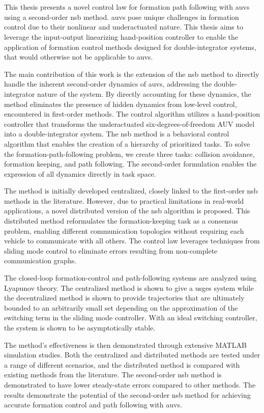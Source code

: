 \chapter*{\englishabstractname}
%
This thesis presents a novel control law for formation path following with \glspl{auv} using a second-order \gls{nsb} method. \glspl{auv} pose unique challenges in formation control due to their nonlinear and underactuated nature. This thesis aims to leverage the input-output linearizing hand-position controller to enable the application of formation control methods designed for double-integrator systems, that would otherwise not be applicable to \glspl{auv}.

The main contribution of this work is the extension of the \gls{nsb} method to directly handle the inherent second-order dynamics of \glspl{auv}, addressing the double-integrator nature of the system. By directly accounting for these dynamics, the method eliminates the presence of hidden dynamics from low-level control, encountered in first-order methods. The control algorithm utilizes a hand-position controller that transforms the underactuated six-degrees-of-freedom AUV model into a double-integrator system. The \gls{nsb} method is a behavioral control algorithm that enables the creation of a hierarchy of prioritized tasks. To solve the formation-path-following problem, we create three tasks: collision avoidance, formation keeping, and path following. The second-order formulation enables the expression of all dynamics directly in task space.

The method is initially developed centralized, closely linked to the first-order \gls{nsb} methods in the literature.  However, due to practical limitations in real-world applications, a novel distributed version of the \gls{nsb} algorithm is proposed. This distributed method reformulates the formation-keeping task as a consensus problem, enabling different communication topologies without requiring each vehicle to communicate with all others. The control law leverages techniques from sliding mode control to eliminate errors resulting from non-complete communication graphs.

The closed-loop formation-control and path-following systems are analyzed using Lyapunov theory. The centralized method is shown to give a \gls{usges} system while the decentralized method is shown to provide trajectories that are ultimately bounded to an arbitrarily small set depending on the approximation of the switching term in the sliding mode controller. With an ideal switching controller, the system is shown to be asymptotically stable.

The method's effectiveness is then demonstrated through extensive MATLAB simulation studies. Both the centralized and distributed methods are tested under a range of different scenarios, and the distributed method is compared with existing methods from the literature. The second-order \gls{nsb} method is demonstrated to have lower steady-state errors compared to other methods. The results demonstrate the potential of the second-order \gls{nsb} method for achieving accurate formation control and path following with \glspl{auv}.
%
\clearpage
